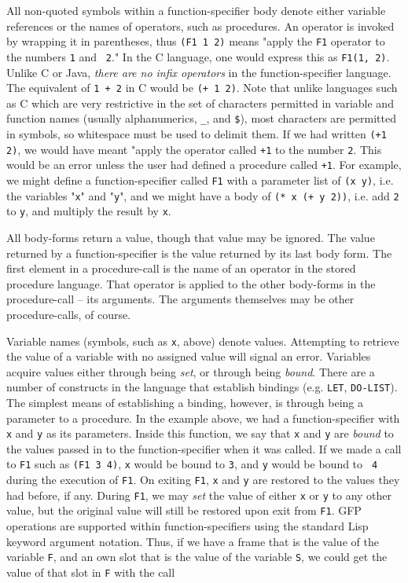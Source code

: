 All non-quoted symbols within a function-specifier body denote either
variable references or the names of operators, such as procedures.  An
operator is invoked by wrapping it in parentheses, thus {\tt (F1 1 2)}
means "apply the {\tt F1} operator to the numbers {\tt 1} and {\tt
2}."  In the C language, one would express this as {\tt F1(1, 2)}.
Unlike C or Java, {\em there are no infix operators} in the
function-specifier language.  The equivalent of {\tt 1 + 2} in C would
be {\tt (+ 1 2)}.  Note that unlike languages such as C which are very
restrictive in the set of characters permitted in variable and
function names (usually alphanumerics, {\tt \_}, and {\tt \$}), most
characters are permitted in symbols, so whitespace must be used to
delimit them.  If we had written {\tt (+1 2)}, we would have meant
"apply the operator called {\tt +1} to the number {\tt 2}.  This would
be an error unless the user had defined a procedure called {\tt +1}.
For example, we might define a function-specifier called {\tt F1} with
a parameter list of {\tt (x y)}, i.e. the variables "{\tt x}" and
"{\tt y}", and we might have a body of {\tt (* x (+ y 2))}, i.e. add
{\tt 2} to {\tt y}, and multiply the result by {\tt x}.

All body-forms return a value, though that value may be ignored.  The
value returned by a function-specifier is the value returned by its
last body form.  The first element in a procedure-call is the name of
an operator in the stored procedure language.  That operator is
applied to the other body-forms in the procedure-call -- its
arguments.  The arguments themselves may be other procedure-calls, of
course.

Variable names (symbols, such as {\tt x}, above) denote values.
Attempting to retrieve the value of a variable with no assigned value
will signal an error.  Variables acquire values either through being
{\em set}, or through being {\em bound}.  There are a number of
constructs in the language that establish bindings (e.g. {\tt LET},
{\tt DO-LIST}).  The simplest means of establishing a binding,
however, is through being a parameter to a procedure.  In the example
above, we had a function-specifier with {\tt x} and {\tt y} as its
parameters.  Inside this function, we say that {\tt x} and {\tt y} are
{\em bound} to the values passed in to the function-specifier when it
was called.  If we made a call to {\tt F1} such as {\tt (F1 3 4)},
{\tt x} would be bound to {\tt 3}, and {\tt y} would be bound to {\tt
4} during the execution of {\tt F1}.  On exiting {\tt F1}, {\tt x} and
{\tt y} are restored to the values they had before, if any.  During
{\tt F1}, we may {\em set} the value of either {\tt x} or {\tt y} to
any other value, but the original value will still be restored upon
exit from {\tt F1}.  GFP operations are supported within
function-specifiers using the standard Lisp keyword argument notation.
Thus, if we have a frame that is the value of the variable {\tt F},
and an own slot that is the value of the variable {\tt S}, we could
get the value of that slot in {\tt F} with the call

